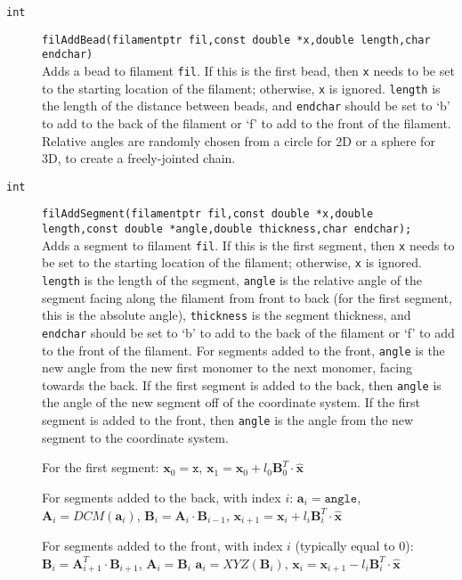 \documentclass {scrbook}
\newcommand {\ttt} {\texttt}
\begin{document}
\begin{description}
\item[\ttt{int}]
\ttt{filAddBead(filamentptr fil,const double *x,double length,char endchar)}
\hfill \\
Adds a bead to filament \ttt{fil}. If this is the first bead, then \ttt{x} needs to be set to the starting location of the filament; otherwise, \ttt{x} is ignored. \ttt{length} is the length of the distance between beads, and \ttt{endchar} should be set to `b' to add to the back of the filament or `f' to add to the front of the filament. Relative angles are randomly chosen from a circle for 2D or a sphere for 3D, to create a freely-jointed chain.

\item[\ttt{int}]
\ttt{filAddSegment(filamentptr fil,const double *x,double length,const double *angle,double thickness,char endchar);}
\hfill \\
Adds a segment to filament \ttt{fil}. If this is the first segment, then \ttt{x} needs to be set to the starting location of the filament; otherwise, \ttt{x} is ignored. \ttt{length} is the length of the segment, \ttt{angle} is the relative angle of the segment facing along the filament from front to back (for the first segment, this is the absolute angle), \ttt{thickness} is the segment thickness, and \ttt{endchar} should be set to `b' to add to the back of the filament or `f' to add to the front of the filament. For segments added to the front, \ttt{angle} is the new angle from the new first monomer to the next monomer, facing towards the back. If the first segment is added to the back, then \ttt{angle} is the angle of the new segment off of the coordinate system. If the first segment is added to the front, then \ttt{angle} is the angle from the new segment to the coordinate system.

For the first segment:
$\mathbf{x}_0=\ttt{x}$,
$\mathbf{x}_1=\mathbf{x}_0 + l_0 \mathbf{B}^T_0 \cdot \mathbf{\hat{x}}$

For segments added to the back, with index $i$:
$\mathbf{a}_i = \ttt{angle}$,
$\mathbf{A}_i = DCM(\mathbf{a}_i)$,
$\mathbf{B}_i = \mathbf{A}_i \cdot \mathbf{B}_{i-1}$,
$\mathbf{x}_{i+1} = \mathbf{x}_i + l_i \mathbf{B}^T_i \cdot \mathbf{\hat{x}}$

For segments added to the front, with index $i$ (typically equal to 0):
$\mathbf{B}_i = \mathbf{A}_{i+1}^T \cdot \mathbf{B}_{i+1}$,
$\mathbf{A}_i = \mathbf{B}_i$
$\mathbf{a}_i = XYZ(\mathbf{B}_i)$,
$\mathbf{x}_i = \mathbf{x}_{i+1} - l_i \mathbf{B}^T_i \cdot \mathbf{\hat{x}}$


\end{description}
\end{document}

